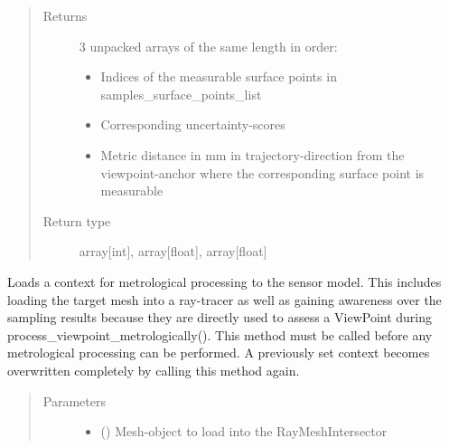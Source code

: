 \documentclass[letterpaper,10pt,english]{sphinxmanual}
\begin{document}
\begin{fulllineitems}
\begin{fulllineitems}
\begin{quote}
\begin{description}
\begin{itemize}
\end{itemize}

\item[{Returns}] \leavevmode

3 unpacked arrays of the same length in order:
\begin{itemize}
\item {} 
Indices of the measurable surface points in samples\_surface\_points\_list

\item {} 
Corresponding uncertainty-scores

\item {} 
Metric distance in mm in trajectory-direction from the viewpoint-anchor where the corresponding surface point is measurable

\end{itemize}


\item[{Return type}] \leavevmode
array{[}int{]}, array{[}float{]}, array{[}float{]}

\end{description}\end{quote}

\end{fulllineitems}


\begin{fulllineitems}
\label{\detokenize{module_sensor_model:agiprobot_measurement.sensor_model.SensorModel.set_processing_context}}
Loads a context for metrological processing to the sensor model.
This includes loading the target mesh into a ray-tracer as well as gaining awareness over the
sampling results because they are directly used to assess a ViewPoint during process\_viewpoint\_metrologically().
This method must be called before any metrological processing can be performed. A previously set
context becomes overwritten completely by calling this method again.
\begin{quote}\begin{description}
\item[{Parameters}] \leavevmode\begin{itemize}
\item {} 
 () \textendash{} Mesh-object to load into the RayMeshIntersector


\end{itemize}
\end{description}
\end{quote}
\end{fulllineitems}
\end{fulllineitems}
\end{document}
